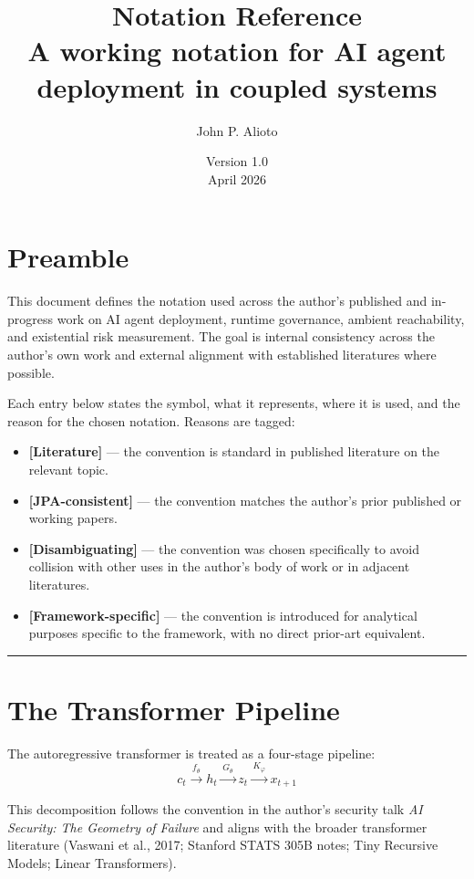 \documentclass[11pt]{article}
\title{\textbf{Notation Reference}\\[0.3em]
\large A working notation for AI agent deployment in coupled systems}
\author{John P. Alioto}
\date{Version 1.0 \\ April 2026}
\begin{document}
\maketitle

\section*{Preamble}

This document defines the notation used across the author's published and in-progress work on AI agent deployment, runtime governance, ambient reachability, and existential risk measurement. The goal is internal consistency across the author's own work and external alignment with established literatures where possible.

Each entry below states the symbol, what it represents, where it is used, and the reason for the chosen notation. Reasons are tagged:

\begin{itemize}
    \item \textbf{[Literature]} --- the convention is standard in published literature on the relevant topic.
    \item \textbf{[JPA-consistent]} --- the convention matches the author's prior published or working papers.
    \item \textbf{[Disambiguating]} --- the convention was chosen specifically to avoid collision with other uses in the author's body of work or in adjacent literatures.
    \item \textbf{[Framework-specific]} --- the convention is introduced for analytical purposes specific to the framework, with no direct prior-art equivalent.
\end{itemize}

\bigskip
\hrule
\bigskip

\section{The Transformer Pipeline}

The autoregressive transformer is treated as a four-stage pipeline:
\[
c_t \xrightarrow{\,f_\theta\,} h_t \xrightarrow{\,G_\theta\,} z_t \xrightarrow{\,K_\varphi\,} x_{t+1}
\]

This decomposition follows the convention in the author's security talk \emph{AI Security: The Geometry of Failure} and aligns with the broader transformer literature (Vaswani et al., 2017; Stanford STATS 305B notes; Tiny Recursive Models; Linear Transformers).
\end{document}
